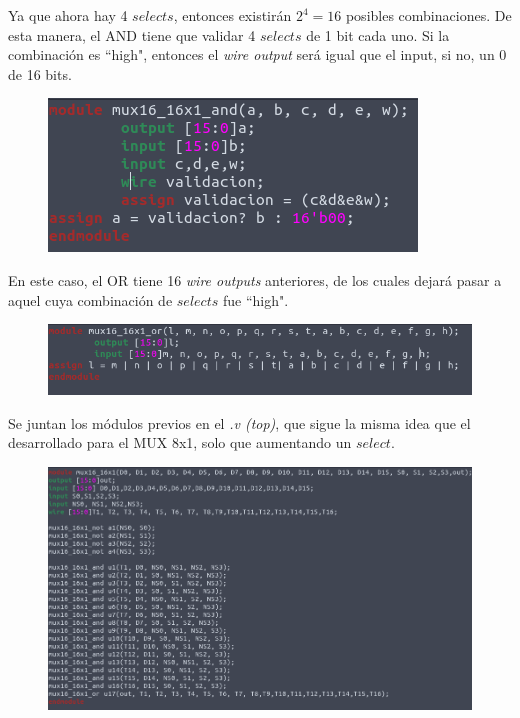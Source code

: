 \documentclass[11pt,a4paper]{article}
\begin{document}
\begin{enumerate}
\begin{enumerate}[label=(\alph*)]
Ya que ahora hay 4 $selects$, entonces existirán $2^4 = 16$ posibles combinaciones. De esta manera, el AND tiene que validar 4 $selects$ de 1 bit cada uno. Si la combinación es ``high", entonces el \textit{wire output} será igual que el input, si no, un 0 de 16 bits.
\pagebreak
\begin{figure}[h]
\centering
\includegraphics[scale=0.7]{16_16x1MUX_2.png} 
\end{figure}

En este caso, el OR tiene 16 \textit{wire outputs} anteriores, de los cuales dejará pasar a aquel cuya combinación de $selects$ fue ``high".

\begin{figure}[h!]
\centering
\includegraphics[scale=0.4]{16_16x1MUX_1.png} 
\end{figure}

Se juntan los módulos previos en el \textit{.v (top)}, que sigue la misma idea que el desarrollado para el MUX 8x1, solo que aumentando un $select$.
\begin{figure}[h!]
\centering
\includegraphics[scale=0.4]{16_16x1MUX_4.png} 
\end{figure}


\end{enumerate}
\end{enumerate}
\end{document}
